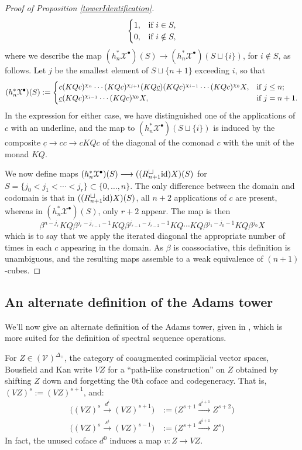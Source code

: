 \documentclass[11pt]{amsart}
\theoremstyle{plain}
\theoremstyle{definition}
\renewcommand{\to}{\longrightarrow}
\newcommand{\calX}{\mathcal{X}}
\newcommand{\calV}{\mathcal{V}}
\theoremstyle{plain}
\newcommand{\vect}[2]{\calV^{#1}_{#2}}
\newcommand{\Id}{\textup{id}}
\newcommand{\plainD}{R}
\begin{document}
\begin{BK spec seq}
\begin{proof}[Proof of Proposition \ref{towerIdentification}]
\[\begin{cases}
1,&\textup{if }i\in S,\\
0,&\textup{if }i\notin S,
\end{cases}
\]
where we describe the map $(h_n^*\calX^\bullet)(S)\to (h_n^*\calX^\bullet)(S\sqcup\{i\})$, for $i\notin S$, as follows. Let $j$ be the smallest element of $S\sqcup\{n+1\}$ exceeding $i$, so that
\[(h_n^*\calX^\bullet)(S):= \begin{cases}
c(KQc)^{\chi_{n}}\cdots (KQc)^{\chi_{j+1}}(KQ\underline{c})(KQc)^{\chi_{i-1}}\cdots (KQc)^{\chi_0}X,&\textup{if }j\leq n;\\
\underline{c}(KQc)^{\chi_{i-1}}\cdots (KQc)^{\chi_0}X,&\textup{if }j=n+1.
\end{cases}
\]
In the expression for either case, we have distinguished one of the applications of $c$ with an underline, and the map to $(h_n^*\calX^\bullet)(S\sqcup\{i\})$ is induced by the composite $\underline{c}\to cc\to cKQc$ of the diagonal of the comonad $c$ with the unit of the monad $KQ$. 

We now define maps $(h_n^*\calX^\bullet)(S)\to (({\plainD}_{n+1}^{\smash{\square}}\Id )X)(S)$ for $S=\{j_0<j_1<\cdots<j_r\}\subset\{0,\ldots,n\}$. 
The only difference between the domain and codomain is that in $(({\plainD}_{n+1}^{\smash{\square}}\Id )X)(S)$, all $n+2$ applications of $c$ are present, whereas in $(h_n^*\calX^\bullet)(S)$, only $r+2$ appear. The map is then
\[\beta^{n-j_r}KQ\beta^{j_r-j_{r-1}-1}KQ\beta^{j_{r-1}-j_{r-2}-1}KQ\cdots KQ\beta^{j_{1}-j_0-1}KQ\beta^{j_0}X\]
which is to say that we apply the iterated diagonal the appropriate number of times in each $c$ appearing in the domain. As $\beta$ is coassociative, this definition is unambiguous, and the resulting maps assemble to a weak equivalence of $(n+1)$-cubes. 
\end{proof}

\subsection{An alternate definition of the Adams tower}
We'll now give an alternate definition of the Adams tower, given in \cite{BK_pairings_products.pdf}, which is more suited for the definition of spectral sequence operations.

For $Z\in (\vect{}{})^{\Delta_+}$, the category of coaugmented cosimplicial vector spaces, Bousfield and Kan write $VZ$ for a ``path-like construction'' \cite[\S3.1]{BK_pairings_products.pdf} on $Z$ obtained by shifting $Z$ down and forgetting the 0th coface and codegeneracy. That is, $(VZ)^s:=(VZ)^{s+1}$, and:
\begin{align*}
\bigl((VZ)^s\overset{d^i}{\to} (VZ)^{s+1}\bigr)&:=\bigl(Z^{s+1}\overset{d^{i+1}}{\to} Z^{s+2}\bigr)\\
\bigl((VZ)^s\overset{s^i}{\to} (VZ)^{s-1}\bigr)&:=\bigl(Z^{s+1}\overset{d^{i+1}}{\to} Z^{s}\bigr)
\end{align*}
In fact, the unused coface $d^0$ induces a map $v:Z\to VZ$.


\end{BK spec seq}
\end{document}
